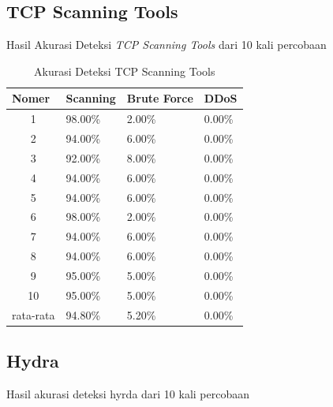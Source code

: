 \subsection{TCP Scanning Tools}
Hasil Akurasi Deteksi \emph{TCP Scanning Tools} dari 10 kali percobaan 
\begin{table}[H]
	\centering
	\caption{Akurasi Deteksi TCP Scanning Tools}
	\label{Akurasi Deteksi TCP Scanning Tools}
	\begin{tabular}{|c|l|l|l|}
		\hline
		\multicolumn{1}{|l|}{Nomer}     & Scanning & Brute Force & DDoS   \\ \hline
		1                               & 98.00\%  & 2.00\%      & 0.00\% \\ \hline
		2                               & 94.00\%  & 6.00\%      & 0.00\% \\ \hline
		3                               & 92.00\%  & 8.00\%      & 0.00\% \\ \hline
		4                               & 94.00\%  & 6.00\%      & 0.00\% \\ \hline
		5                               & 94.00\%  & 6.00\%      & 0.00\% \\ \hline
		6                               & 98.00\%  & 2.00\%      & 0.00\% \\ \hline
		7                               & 94.00\%  & 6.00\%      & 0.00\% \\ \hline
		8                               & 94.00\%  & 6.00\%      & 0.00\% \\ \hline
		9                               & 95.00\%  & 5.00\%      & 0.00\% \\ \hline
		10                              & 95.00\%  & 5.00\%      & 0.00\% \\ \hline
		\multicolumn{1}{|l|}{rata-rata} & 94.80\%  & 5.20\%      & 0.00\% \\ \hline
	\end{tabular}
\end{table}


\subsection{Hydra}
Hasil akurasi deteksi hyrda dari 10 kali percobaan 

